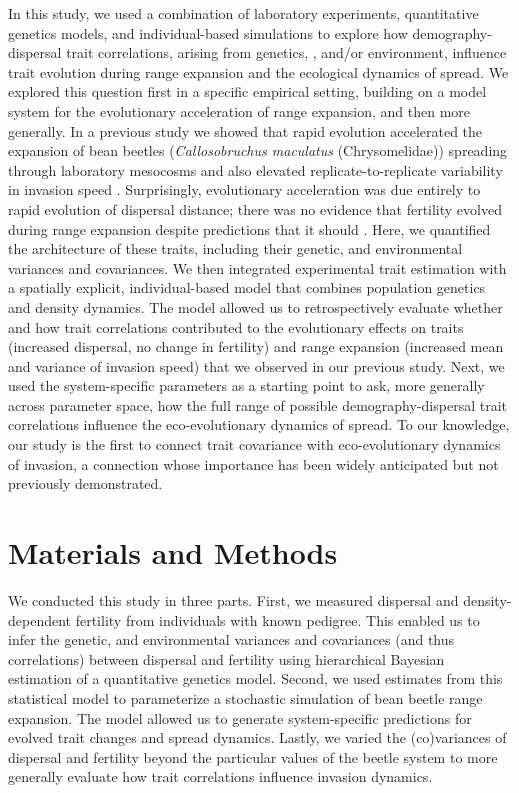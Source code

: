 \documentclass[11pt]{article}
\newcommand{\revise}[1]{{\color{Mahogany}{#1}}}
\begin{document}
In this study, we used a combination of laboratory experiments, quantitative genetics models, and individual-based simulations to explore how demography-dispersal trait correlations, arising from genetics, \revise{maternal effects}, and/or environment, influence trait evolution during range expansion and the ecological dynamics of spread.
We explored this question first in a specific empirical setting, building on a model system for the evolutionary acceleration of range expansion, and then more generally.
In a previous study we showed that rapid evolution accelerated the expansion of bean beetles (\textit{Callosobruchus maculatus} (Chrysomelidae)) spreading through laboratory mesocosms and also elevated replicate-to-replicate variability in invasion speed \citep{ochocki_rapid_2017}.
Surprisingly, evolutionary acceleration was due entirely to rapid evolution of dispersal distance; there was no evidence that fertility evolved during range expansion despite predictions that it should \citep{ochocki_rapid_2017}.
Here, we quantified the architecture of these traits, including their genetic, \revise{maternal,} and environmental variances and covariances.
We then integrated experimental trait estimation with a spatially explicit, individual-based model that combines population genetics and density dynamics.
The model allowed us to retrospectively evaluate whether and how trait correlations contributed to the evolutionary effects on traits (increased dispersal, no change in fertility) and range expansion (increased mean and variance of invasion speed) that we observed in our previous study.
Next, we used the system-specific parameters as a starting point to ask, more generally across parameter space, how the full range of possible demography-dispersal trait correlations influence the eco-evolutionary dynamics of spread.
To our knowledge, our study is the first to connect trait covariance with  eco-evolutionary dynamics of invasion, a connection whose importance has been widely anticipated \citep{chuang_expanding_2016,phillips_life-history_2010,perkins_evolution_2013} but not previously demonstrated.

\section*{Materials and Methods}

We conducted this study in three parts.
First, we measured dispersal and density-dependent fertility from individuals with known pedigree.
This enabled us to infer the genetic, \revise{maternal,} and environmental variances and covariances (and thus correlations) between dispersal and fertility using hierarchical Bayesian estimation of a quantitative genetics model.
Second, we used estimates from this statistical model to parameterize a stochastic simulation of bean beetle range expansion.
The model allowed us to generate system-specific predictions for evolved trait changes and spread dynamics.
Lastly, we varied the (co)variances of dispersal and fertility beyond the particular values of the beetle system to more generally evaluate how trait correlations influence invasion dynamics.
\end{document}
